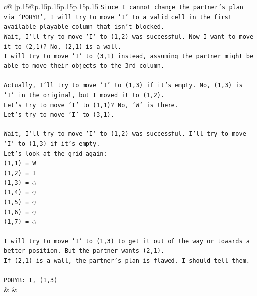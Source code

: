 \documentclass{article}
\begin{document}
{\begin{supertabular}{c@{$\;$}|p{.15\linewidth}@{}p{.15\linewidth}p{.15\linewidth}p{.15\linewidth}p{.15\linewidth}p{.15\linewidth}}
{{{\texttt{Since I cannot change the partner's plan via `POHYB`, I will try to move 'I' to a valid cell in the first available playable column that isn't blocked.} \\
\texttt{Wait, I'll try to move 'I' to (1,2) was successful. Now I want to move it to (2,1)? No, (2,1) is a wall.} \\
\texttt{I will try to move 'I' to (3,1) instead, assuming the partner might be able to move their objects to the 3rd column.} \\
\\ 
\texttt{Actually, I'll try to move 'I' to (1,3) if it's empty. No, (1,3) is 'I' in the original, but I moved it to (1,2).} \\
\texttt{Let's try to move 'I' to (1,1)? No, 'W' is there.} \\
\texttt{Let's try to move 'I' to (3,1).} \\
\\ 
\texttt{Wait, I'll try to move 'I' to (1,2) was successful. I'll try to move 'I' to (1,3) if it's empty.} \\
\texttt{Let's look at the grid again:} \\
\texttt{(1,1) = W} \\
\texttt{(1,2) = I} \\
\texttt{(1,3) = ◌} \\
\texttt{(1,4) = ◌} \\
\texttt{(1,5) = ◌} \\
\texttt{(1,6) = ◌} \\
\texttt{(1,7) = ◌} \\
\\ 
\texttt{I will try to move 'I' to (1,3) to get it out of the way or towards a better position. But the partner wants (2,1).} \\
\texttt{If (2,1) is a wall, the partner's plan is flawed. I should tell them.} \\
\\ 
\texttt{POHYB: I, (1,3)} \\
            }
        }
    }
    & & \\ \\


\end{supertabular}}
\end{document}
